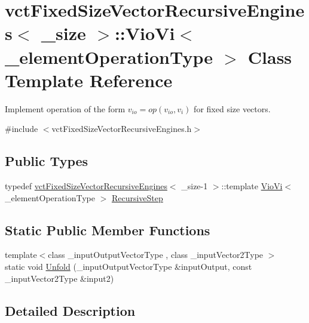 \hypertarget{classvct_fixed_size_vector_recursive_engines_1_1_vio_vi}{}\section{vct\+Fixed\+Size\+Vector\+Recursive\+Engines$<$ \+\_\+size $>$\+:\+:Vio\+Vi$<$ \+\_\+element\+Operation\+Type $>$ Class Template Reference}
\label{classvct_fixed_size_vector_recursive_engines_1_1_vio_vi}


Implement operation of the form $v_{io} = op(v_{io}, v_i)$ for fixed size vectors.  




{\ttfamily \#include $<$vct\+Fixed\+Size\+Vector\+Recursive\+Engines.\+h$>$}

\subsection*{Public Types}
\begin{DoxyCompactItemize}
\item 
typedef \hyperlink{classvct_fixed_size_vector_recursive_engines}{vct\+Fixed\+Size\+Vector\+Recursive\+Engines}$<$ \+\_\+size-\/1 $>$\+::template \hyperlink{classvct_fixed_size_vector_recursive_engines_1_1_vio_vi}{Vio\+Vi}$<$ \+\_\+element\+Operation\+Type $>$ \hyperlink{classvct_fixed_size_vector_recursive_engines_1_1_vio_vi_a1b0e842f1ca3b4e60a18b11e85382449}{Recursive\+Step}
\end{DoxyCompactItemize}
\subsection*{Static Public Member Functions}
\begin{DoxyCompactItemize}
\item 
{\footnotesize template$<$class \+\_\+input\+Output\+Vector\+Type , class \+\_\+input\+Vector2\+Type $>$ }\\static void \hyperlink{classvct_fixed_size_vector_recursive_engines_1_1_vio_vi_a936aa5043ac96ec178f26df243e6afc7}{Unfold} (\+\_\+input\+Output\+Vector\+Type \&input\+Output, const \+\_\+input\+Vector2\+Type \&input2)
\end{DoxyCompactItemize}


\subsection{Detailed Description}
